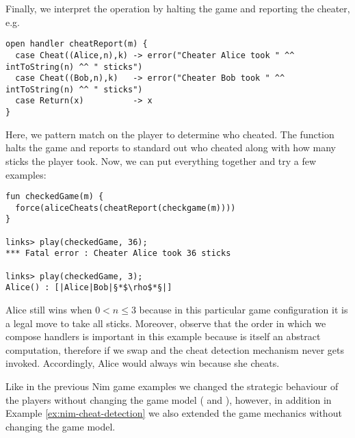 \begin{example}
Finally, we interpret the  operation by halting the game and reporting the cheater, e.g.
\begin{lstlisting}[style=links]
open handler cheatReport(m) {
  case Cheat((Alice,n),k) -> error("Cheater Alice took " ^^ intToString(n) ^^ " sticks")
  case Cheat((Bob,n),k)   -> error("Cheater Bob took " ^^ intToString(n) ^^ " sticks")
  case Return(x)          -> x
}
\end{lstlisting}
Here, we pattern match on the player to determine who cheated. The  function halts the game and reports to standard out who cheated along with how many sticks the player took. Now, we can put everything together and try a few examples:
\begin{lstlisting}[style=links]
fun checkedGame(m) {
  force(aliceCheats(cheatReport(checkgame(m))))
}

links> play(checkedGame, 36);
*** Fatal error : Cheater Alice took 36 sticks

links> play(checkedGame, 3);
Alice() : [|Alice|Bob|§*$\rho$*§|]
\end{lstlisting}
Alice still wins when $0 < n \leq 3$ because in this particular game configuration it is a legal move to take all sticks.
Moreover, observe that the order in which we compose handlers is important in this example because  is itself an abstract computation, therefore if we swap  and  the cheat detection mechanism never gets invoked. Accordingly, Alice would always win because she cheats.
\end{example}
Like in the previous Nim game examples we changed the strategic behaviour of the players without changing the game model ( and ), however, in addition in Example \ref{ex:nim-cheat-detection} we also extended the game mechanics without changing the game model.